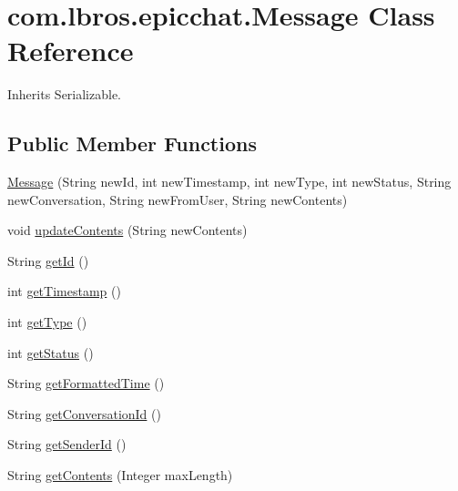 \hypertarget{classcom_1_1lbros_1_1epicchat_1_1_message}{\section{com.\-lbros.\-epicchat.\-Message Class Reference}
\label{classcom_1_1lbros_1_1epicchat_1_1_message}
}


Inherits Serializable.

\subsection*{Public Member Functions}
\begin{DoxyCompactItemize}
\item 
\hyperlink{classcom_1_1lbros_1_1epicchat_1_1_message_a72c8db85e2e4e41efabb2717db9ad033}{Message} (String new\-Id, int new\-Timestamp, int new\-Type, int new\-Status, String new\-Conversation, String new\-From\-User, String new\-Contents)
\item 
void \hyperlink{classcom_1_1lbros_1_1epicchat_1_1_message_a2de86cb9363247bdfb12d6419c528df7}{update\-Contents} (String new\-Contents)
\item 
String \hyperlink{classcom_1_1lbros_1_1epicchat_1_1_message_a353e7c33c9abc37609ea1f47a8ba3ea2}{get\-Id} ()
\item 
int \hyperlink{classcom_1_1lbros_1_1epicchat_1_1_message_a5c3e7c76ccf7c51e6fb67b58b07b8fe0}{get\-Timestamp} ()
\item 
int \hyperlink{classcom_1_1lbros_1_1epicchat_1_1_message_af9d1de6ab0f81872d807a059a2d380bc}{get\-Type} ()
\item 
int \hyperlink{classcom_1_1lbros_1_1epicchat_1_1_message_a623764b7016122267f8bdd97f612fe9f}{get\-Status} ()
\item 
String \hyperlink{classcom_1_1lbros_1_1epicchat_1_1_message_ac22714c4c929ee1e5f820054b437d321}{get\-Formatted\-Time} ()
\item 
String \hyperlink{classcom_1_1lbros_1_1epicchat_1_1_message_a15c9f151bdf1bf75f00cc5966cfb96ac}{get\-Conversation\-Id} ()
\item 
String \hyperlink{classcom_1_1lbros_1_1epicchat_1_1_message_ac4bd96a50b599ec8ef1ab265420818ca}{get\-Sender\-Id} ()
\item 
String \hyperlink{classcom_1_1lbros_1_1epicchat_1_1_message_ad58367cf272b43c00794ad88921f16bc}{get\-Contents} (Integer max\-Length)
\end{DoxyCompactItemize}

